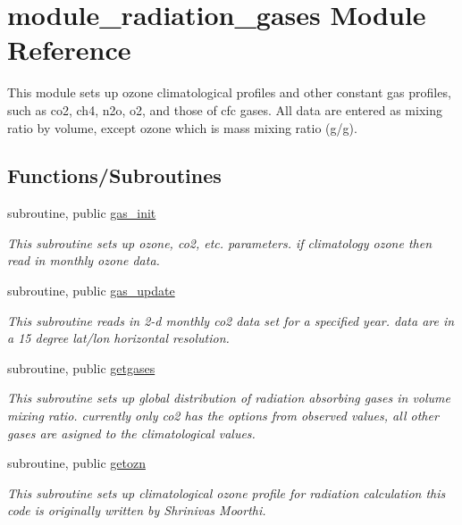 \hypertarget{namespacemodule__radiation__gases}{}\section{module\+\_\+radiation\+\_\+gases Module Reference}
\label{namespacemodule__radiation__gases}


This module sets up ozone climatological profiles and other constant gas profiles, such as co2, ch4, n2o, o2, and those of cfc gases. All data are entered as mixing ratio by volume, except ozone which is mass mixing ratio (g/g).  


\subsection*{Functions/\+Subroutines}
\begin{DoxyCompactItemize}
\item 
subroutine, public \hyperlink{namespacemodule__radiation__gases_a1def261c0ef5d5408658c87b6dc08b53}{gas\+\_\+init}                                                                                           
\begin{DoxyCompactList}\small\item\em This subroutine sets up ozone, co2, etc. parameters. if climatology ozone then read in monthly ozone data. \end{DoxyCompactList}\item 
subroutine, public \hyperlink{namespacemodule__radiation__gases_a064db1c287e8614ae7efd6b4fac91a6b}{gas\+\_\+update}                                                                                       
\begin{DoxyCompactList}\small\item\em This subroutine reads in 2-\/d monthly co2 data set for a specified year. data are in a 15 degree lat/lon horizontal resolution. \end{DoxyCompactList}\item 
subroutine, public \hyperlink{namespacemodule__radiation__gases_ad06401a54d361b3dd852d815d1b0f71e}{getgases}                                                                                           
\begin{DoxyCompactList}\small\item\em This subroutine sets up global distribution of radiation absorbing gases in volume mixing ratio. currently only co2 has the options from observed values, all other gases are asigned to the climatological values. \end{DoxyCompactList}\item 
subroutine, public \hyperlink{namespacemodule__radiation__gases_af4be311f1ec1601a167655c1632d66de}{getozn}                                                                                               
\begin{DoxyCompactList}\small\item\em This subroutine sets up climatological ozone profile for radiation calculation this code is originally written by Shrinivas Moorthi. \end{DoxyCompactList}\end{DoxyCompactItemize}
